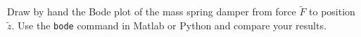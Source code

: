 Draw by hand the Bode plot of the mass spring damper from force $\tilde{F}$ to position $\tilde{z}$.  Use the \texttt{bode} command in Matlab or Python and compare your results.
